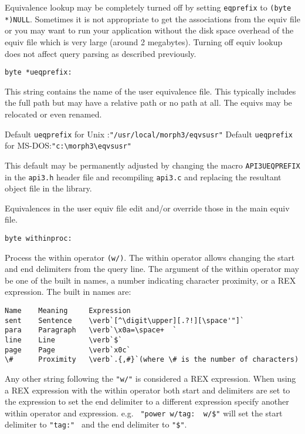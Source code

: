 Equivalence lookup may be completely turned off by setting
\verb`eqprefix` to \verb`(byte *)NULL`.  Sometimes it is not appropriate to get
the associations from the equiv file or you may want to run your
application without the disk space overhead of the equiv file
which is very large (around 2 megabytes).  Turning off equiv
lookup does not affect query parsing as described previously.

\begin{verbatim}
byte *ueqprefix:
\end{verbatim}
This string contains the name of the user equivalence file.  This
typically includes the full path but may have a relative path or
no path at all.  The equivs may be relocated or even renamed.

Default \verb`ueqprefix` for Unix :\verb`"/usr/local/morph3/eqvsusr"`
Default \verb`ueqprefix` for MS-DOS:\verb`"c:\morph3\eqvsusr"`

This default may be permanently adjusted by changing the macro
\verb`API3UEQPREFIX` in the \verb`api3.h` header file and recompiling \verb`api3.c` and
replacing the resultant object file in the library.

Equivalences in the user equiv file edit and/or override those in
the main equiv file.

\begin{verbatim}
byte withinproc:
\end{verbatim}
Process the within operator \verb`(w/)`.  The within operator allows
changing the start and end delimiters from the query line.  The
argument of the within operator may be one of the built in names,
a number indicating character proximity, or a REX expression.  The
built in names are:

\begin{verbatim}
Name    Meaning     Expression
sent    Sentence    \verb`[^\digit\upper][.?!][\space'"]`
para    Paragraph   \verb`\x0a=\space+  `
line    Line        \verb`$`
page    Page        \verb`x0c`
\#      Proximity   \verb`.{,#}`(where \# is the number of characters)
\end{verbatim}

Any other string following the \verb`"w/"` is considered a REX
expression.  When using a REX expression with the within operator
both start and delimiters are set to the expression to set the end
delimiter to a different expression specify another within
operator and expression. e.g. \verb` "power w/tag:  w/$"` will set the
start delimiter to \verb`"tag:" ` and the end delimiter to \verb`"$"`.

